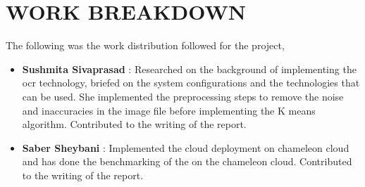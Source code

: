 \documentclass[9pt,twocolumn,twoside]{../../styles/osajnl}
\begin{document}
\section{WORK BREAKDOWN}

The following was the work distribution followed for the project,
\begin{itemize}
\item {\bfseries Sushmita Sivaprasad} : Researched on the background of implementing
the ocr technology, briefed on the system configurations and the
technologies that can be used. She implemented the preprocessing steps
to remove the noise and inaccuracies in the image file before
implementing the K means algorithm. Contributed to the writing of the
report.
\item {\bfseries Saber Sheybani} : Implemented the cloud deployment on
chameleon cloud and has done the benchmarking of the on the chameleon
cloud. Contributed to the writing of the report.
\end{itemize}


\end{document}
